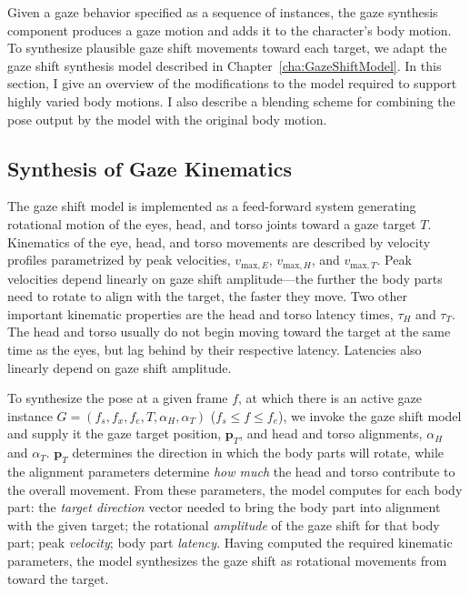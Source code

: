 Given a gaze behavior specified as a sequence of instances, the gaze synthesis component produces a gaze motion and adds it to the character's body motion. To synthesize plausible gaze shift movements toward each target, we adapt the gaze shift synthesis model described in Chapter~\ref{cha:GazeShiftModel}. In this section, I give an overview of the modifications to the model required to support highly varied body motions. I also describe a blending scheme for combining the pose output by the model with the original body motion.

\subsection{Synthesis of Gaze Kinematics}

The gaze shift model is implemented as a feed-forward system generating rotational motion of the eyes, head, and torso joints toward a gaze target $T$. Kinematics of the eye, head, and torso movements are described by velocity profiles parametrized by peak velocities, $v_{\mathrm{max},E}$, $v_{\mathrm{max},H}$, and $v_{\mathrm{max},T}$. Peak velocities depend linearly on gaze shift amplitude---the further the body parts need to rotate to align with the target, the faster they move. Two other important kinematic properties are the head and torso latency times, $\tau_H$ and $\tau_T$. The head and torso usually do not begin moving toward the target at the same time as the eyes, but lag behind by their respective latency. Latencies also linearly depend on gaze shift amplitude.

To synthesize the pose at a given frame $f$, at which there is an active gaze instance $G = (f_s, f_x, f_e, T, \alpha_{H}, \alpha_{T})$ ($f_s \leq f \leq f_e$), we invoke the gaze shift model and supply it the gaze target position, $\mathbf{p}_T$, and head and torso alignments, $\alpha_H$ and $\alpha_T$. $\mathbf{p}_T$ determines the direction in which the body parts will rotate, while the alignment parameters determine \emph{how much} the head and torso contribute to the overall movement. From these parameters, the model computes for each body part: the \emph{target direction} vector needed to bring the body part into alignment with the given target; the rotational \emph{amplitude} of the gaze shift for that body part; peak \emph{velocity}; body part \emph{latency}. Having computed the required kinematic parameters, the model synthesizes the gaze shift as rotational movements from toward the target.

